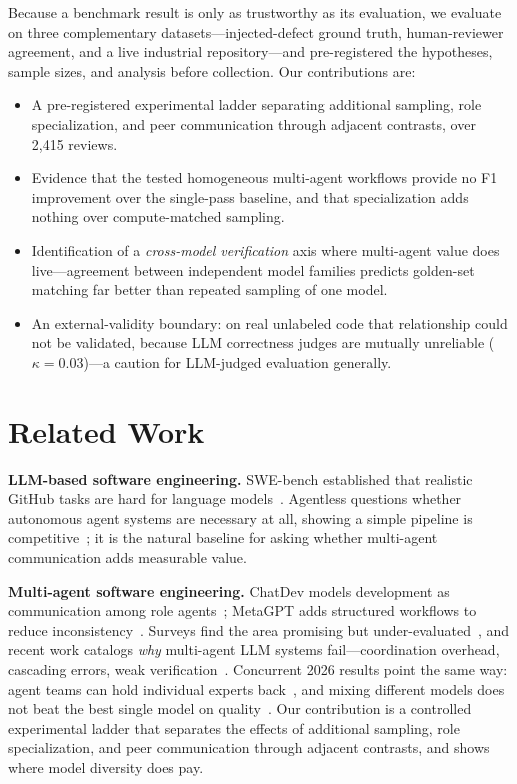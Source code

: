 \documentclass[conference]{IEEEtran}
\begin{document}
Because a benchmark result is only as trustworthy as its evaluation, we evaluate
on three complementary datasets---injected-defect ground truth, human-reviewer
agreement, and a live industrial repository---and pre-registered the hypotheses,
sample sizes, and analysis before collection. Our contributions are:
\begin{itemize}
  \item A pre-registered experimental ladder separating additional sampling,
  role specialization, and peer communication through adjacent contrasts, over
  2{,}415 reviews.
  \item Evidence that the tested homogeneous multi-agent workflows provide no F1
  improvement over the single-pass baseline, and that specialization adds nothing
  over compute-matched sampling.
  \item Identification of a \emph{cross-model verification} axis where
  multi-agent value does live---agreement between independent model families
  predicts golden-set matching far better than repeated sampling of one model.
  \item An external-validity boundary: on real unlabeled code that relationship
  could not be validated, because LLM correctness judges are mutually unreliable
  ($\kappa{=}0.03$)---a caution for LLM-judged evaluation generally.
\end{itemize}

\section{Related Work}

\textbf{LLM-based software engineering.} SWE-bench established that realistic
GitHub tasks are hard for language models~\cite{swebench}. Agentless questions
whether autonomous agent systems are necessary at all, showing a simple pipeline
is competitive~\cite{agentless}; it is the natural baseline for asking whether
multi-agent communication adds measurable value.

\textbf{Multi-agent software engineering.} ChatDev models development as
communication among role agents~\cite{chatdev}; MetaGPT adds structured workflows
to reduce inconsistency~\cite{metagpt}. Surveys find the area promising but
under-evaluated~\cite{survey}, and recent work catalogs \emph{why} multi-agent
LLM systems fail---coordination overhead, cascading errors, weak
verification~\cite{whyfail}. Concurrent 2026 results point the same way: agent
teams can hold individual experts back~\cite{pappu}, and mixing different models
does not beat the best single model on quality~\cite{selfmoa}. Our contribution
is a controlled experimental ladder that separates the effects of additional
sampling, role specialization, and peer communication through adjacent
contrasts, and shows where model diversity does pay.
\end{document}
